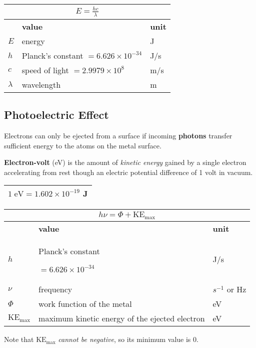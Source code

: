 \begin{tabularx}{\linewidth}{|l|X|l|} \hline
    \multicolumn{3}{|c|}{$E = \frac{hc}{\lambda}$} \\ \hline
    & \textbf{value} & \textbf{unit} \\ \hline
    $E$ & energy & J \\ \hdashline
    $h$ & Planck's constant $= 6.626 \times 10^{-34}$& J/s \\
    $c$ & speed of light $= 2.9979 \times 10^8$ & m/s \\
    $\lambda$ & wavelength & m \\ \hline
\end{tabularx}

\subsection{Photoelectric Effect}
Electrons can only be ejected from a surface if incoming \textbf{photons} transfer
sufficient energy to the atoms on the metal surface.

\textbf{Electron-volt} (eV) is the amount of \textit{kinetic energy} gained by a single
electron accelerating from rest though an electric potential difference of 1 volt in vacuum.

\begin{tabularx}{\linewidth}{|Y|} \hline
    $1 \; \si{\electronvolt} = 1.602 \times 10^{-19}$ \si{\joule} \\ \hline
\end{tabularx}

\begin{tabularx}{\linewidth}{|l|X|l|} \hline
    \multicolumn{3}{|c|}{$h \nu = \Phi + \text{KE}_{\text{max}}$} \\ \hline
    & \textbf{value} & \textbf{unit} \\ \hline
    $h$ & Planck's constant \par $= 6.626 \times 10^{-34}$& J/s \\
    $\nu$ & frequency & $s^{-1}$ or Hz \\ \hdashline
    $\Phi$ & work function of the metal & eV \\
    $\text{KE}_{\text{max}}$ & maximum kinetic energy of the ejected electron & eV \\ \hline
\end{tabularx}

Note that $\text{KE}_{\text{max}}$ \textit{cannot be negative}, so its minimum value is 0.

